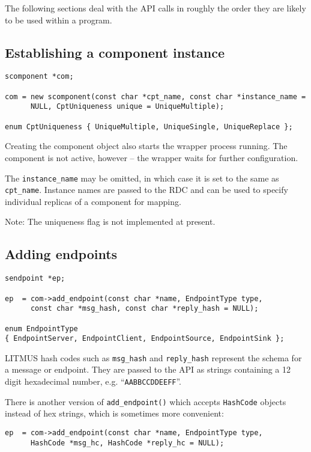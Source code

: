 \documentclass[12pt,a4paper,twoside]{article}
\renewcommand{\_}{\texttt{\symbol{95}}}
\begin{document}
The following sections deal with the API calls in roughly the order
they are likely to be used within a program.

\subsection{Establishing a component instance}

\begin{verbatim}
scomponent *com;

com = new scomponent(const char *cpt_name, const char *instance_name =
      NULL, CptUniqueness unique = UniqueMultiple);

enum CptUniqueness { UniqueMultiple, UniqueSingle, UniqueReplace };
\end{verbatim}

Creating the component object also starts the wrapper process running.
The component is not active, however -- the wrapper waits for further
configuration.

The \verb^instance_name^ may be omitted, in which case it is set to
the same as \verb^cpt_name^. Instance names are passed to the RDC
and can be used to specify individual replicas of a component for
mapping.

Note: The uniqueness flag is not implemented at present.

\subsection{Adding endpoints}

\begin{verbatim}
sendpoint *ep;

ep  = com->add_endpoint(const char *name, EndpointType type,
      const char *msg_hash, const char *reply_hash = NULL);

enum EndpointType
{ EndpointServer, EndpointClient, EndpointSource, EndpointSink };
\end{verbatim}

LITMUS hash codes such as \verb^msg_hash^ and \verb^reply_hash^
represent the schema for a message or endpoint.
They are passed to the API as strings containing a 12 digit
hexadecimal number, e.g. ``\verb^AABBCCDDEEFF^''.

There is another version of \verb^add_endpoint()^ which accepts
\verb^HashCode^ objects instead of hex strings, which is sometimes
more convenient:

\begin{verbatim}
ep  = com->add_endpoint(const char *name, EndpointType type,
      HashCode *msg_hc, HashCode *reply_hc = NULL);
\end{verbatim}
\end{document}
